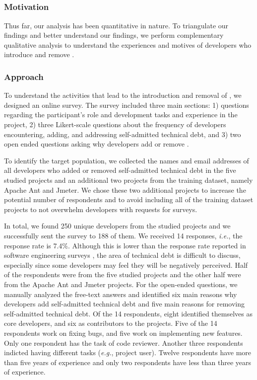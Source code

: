 \subsection*{\rqiv}


\subsubsection*{Motivation} 
Thus far, our analysis has been quantitative in nature. To triangulate our findings and better understand our findings, we perform complementary qualitative analysis to understand the experiences and motives of developers who introduce and remove \SATD.



 
\subsubsection*{Approach} 
To understand the activities that lead to the introduction and removal of \SATD, we designed an online survey. The survey included three main sections: 1)  questions regarding the participant's role and development tasks and experience in the project, 2) three Likert-scale questions about the frequency of developers encountering, adding, and addressing self-admitted technical debt, and 3) two open ended questions asking why developers add or remove \SATD. 

To identify the target population, we collected the names and email addresses of all developers who added or removed self-admitted technical debt in the five studied projects and an additional two projects from the training dataset, namely Apache Ant and Jmeter. We chose these two additional projects to increase the potential number of respondents and to avoid including all of the training dataset projects to not overwhelm developers with requests for surveys.

In total, we found 250 unique developers from the studied projects and we successfully sent the survey to 188 of them.  We received 14 responses, \emph{i.e.}, the response rate is 7.4\%. Although this is lower than the response rate reported in software engineering surveys \cite{Punter2003}, the area of technical debt is difficult to discuss, especially since some developers may feel they will be negatively perceived. Half of the respondents were from the five studied projects and the other half were from the Apache Ant and Jmeter projects. For the open-ended questions, we manually analyzed the free-text answers and identified six main reasons why developers add self-admitted technical debt and five main reasons for removing self-admitted technical debt. Of the 14 respondents, eight identified themselves as core developers, and six as contributors to the projects. Five of the 14 respondents work on fixing bugs, and five work on implementing new features. Only one respondent has the task of code reviewer. Another three respondents indicted having different tasks (\emph{e.g.}, project user). Twelve respondents have more than five years of experience and only two respondents have less than three years of experience.




